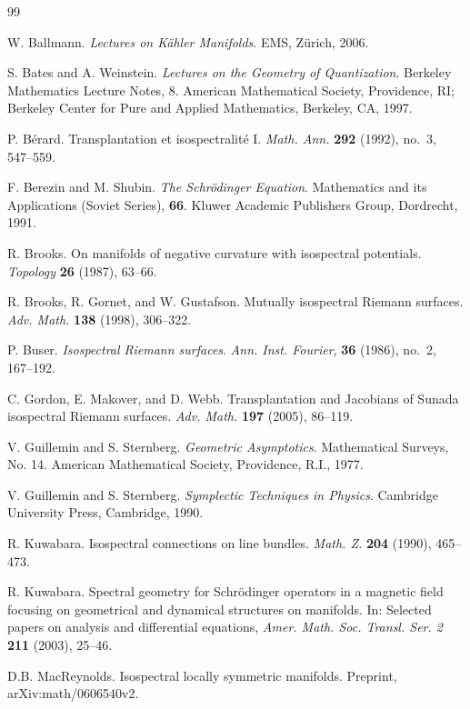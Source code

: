 \documentclass[12pt,leqno]{amsart}%
\theoremstyle{definition}
\theoremstyle{remark}
\numberwithin{equation}{section}
\begin{document}
\begin{thebibliography}{99}

 W. Ballmann. \textit{Lectures on K\"ahler Manifolds}. EMS, Z\"urich, 2006.

 S. Bates and A. Weinstein.  \textit{Lectures on the Geometry of Quantization}.
Berkeley Mathematics Lecture Notes, 8. American Mathematical Society, Providence, RI; Berkeley Center for Pure and Applied Mathematics, Berkeley, CA, 1997.

 P. B\'erard. Transplantation et isospectralit\'e I.
\textit{Math. Ann.} \textbf{292} (1992), no.~3, 547--559.

 F. Berezin and M. Shubin.  \textit{The Schr\"odinger Equation}.  Mathematics
and its Applications (Soviet Series), \textbf{66}. Kluwer Academic Publishers
Group, Dordrecht, 1991.

R. Brooks. On manifolds of negative curvature with isospectral
potentials. \textit{Topology} \textbf{26} (1987), 63--66.

 R. Brooks, R. Gornet, and W. Gustafson. Mutually  isospectral
Riemann surfaces. \textit{Adv. Math.} \textbf{138} (1998), 306--322.

 P. Buser.  \textit{Isospectral Riemann surfaces}. \textit{Ann. Inst. Fourier}, \textbf{36} (1986), no.~2, 167--192.

C. Gordon, E. Makover, and D. Webb. Transplantation and Jacobians
of Sunada isospectral Riemann surfaces. \textit{Adv. Math.} \textbf{197}
(2005), 86--119.

 V. Guillemin and S. Sternberg. \textit{Geometric Asymptotics}.  Mathematical Surveys, No. 14. American Mathematical Society, Providence, R.I.,
1977.

 V. Guillemin and S. Sternberg.  \textit{Symplectic Techniques in Physics}. Cambridge University Press, Cambridge, 1990.

 R. Kuwabara. Isospectral connections on line bundles.
\textit{Math. Z.} \textbf{204} (1990), 465--473.

 R. Kuwabara. Spectral geometry for Schr\"odinger operators in a
magnetic field focusing on geometrical and dynamical structures on manifolds.
In: Selected papers on analysis and differential equations, \textit{Amer.
Math. Soc. Transl. Ser. 2} \textbf{211} (2003), 25--46.

 D.B. MacReynolds. Isospectral locally symmetric manifolds.
Preprint, arXiv:math/0606540v2.


\end{thebibliography}
\end{document}
